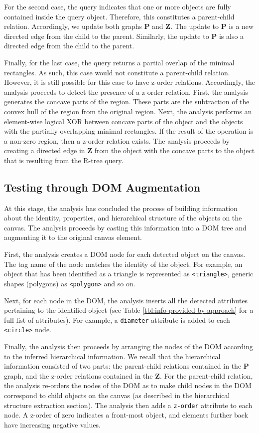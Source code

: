 For the second case, the query indicates that one or more objects are fully contained inside the query object.
Therefore, this constitutes a parent-child relation.
Accordingly, we update both graphs $\mathbf{P}$ and $\mathbf{Z}$.
The update to $\mathbf{P}$ is a new directed edge from the child to the parent.
Similarly, the update to $\mathbf{P}$ is also a directed edge from the child to the parent.

Finally, for the last case, the query returns a partial overlap of the minimal rectangles.
As such, this case would not constitute a parent-child relation.
However, it is still possible for this case to have z-order relations.
Accordingly, the analysis proceeds to detect the presence of a z-order relation.
First, the analysis generates the concave parts of the region.
These parts are the subtraction of the convex hull of the region from the original region.
Next, the analysis performs an element-wise logical XOR between concave parts of the object and the objects with the partially overlapping minimal rectangles.
If the result of the operation is a non-zero region, then a z-order relation exists.
The analysis proceeds by creating a directed edge in $\mathbf{Z}$ from the object with the concave parts to the object that is resulting from the R-tree query.


\subsection{Testing through DOM Augmentation}
\label{subsec:testing-using-dom}
At this stage, the analysis has concluded the process of building information about the identity, properties, and hierarchical structure of the objects on the canvas. The analysis proceeds by casting this information into a DOM tree and augmenting it to the original canvas element.

First, the analysis creates a DOM node for each detected object on the canvas. The tag name of the node matches the identity of the object. For example, an object that has been identified as a triangle is represented as \verb|<triangle>|, generic shapes (polygons) as \verb|<polygon>| and so on. 

Next, for each node in the DOM, the analysis inserts all the detected attributes pertaining to the identified object (see Table \ref{tbl:info-provided-by-approach} for a full list of attributes). For example, a \verb|diameter| attribute is added to each \verb|<circle>| node.

Finally, the analysis then proceeds by arranging the nodes of the DOM according to the inferred hierarchical information. We recall that the hierarchical information consisted of two parts: the parent-child relations contained in the $\mathbf{P}$ graph, and the z-order relations contained in the $\mathbf{Z}$. For the parent-child relation, the analysis re-orders the nodes of the DOM as to make child nodes in the DOM correspond to child objects on the canvas (as described in the hierarchical structure extraction section). The analysis then adds a \verb|z-order| attribute to each node. A z-order of zero indicates a front-most object, and elements further back have increasing negative values.

